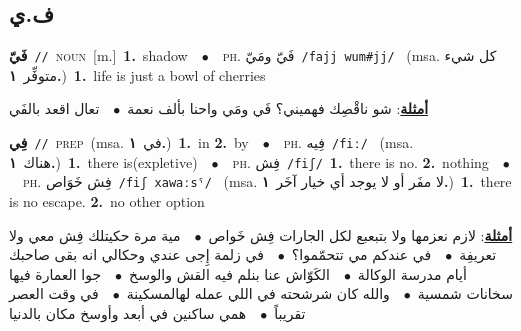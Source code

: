 \documentclass[10pt,a4paper,twoside]{article} %
\begin{document}
\begin{multicols}{2}
\vspace{-3mm}
\subsection*{\color{blue}\foreignlanguage{arabic}{ف.ي}\color{blue}{}} 

{\setlength\topsep{0pt}\textbf{\foreignlanguage{arabic}{فَيّ}}\ {\color{gray}\texttt{//}\color{black}}\ \textsc{noun}\ [m.]\ \textbf{1.}~shadow\ \ $\bullet$\ \ \textsc{ph.} \color{gray} \foreignlanguage{arabic}{فَيّ ومَيّ}\color{black}\ {\color{gray}\texttt{/{\sffamily fajj wum\#jj}/}\color{black}}\ \color{gray} (msa. \foreignlanguage{arabic}{كل شيء متوفِّر}~\foreignlanguage{arabic}{\textbf{١.}})\color{black}\ \textbf{1.}~life is just a bowl of cherries\  \begin{flushright}\color{gray}\foreignlanguage{arabic}{\textbf{\underline{\foreignlanguage{arabic}{أمثلة}}}: شو ناقْصِك فهميني؟ فَي ومَي واحنا بألف نعمة\ $\bullet$\ \  تعال اقعد بالفَي}\end{flushright}\color{black}} \vspace{2mm}

{\setlength\topsep{0pt}\textbf{\foreignlanguage{arabic}{فِي}}\ {\color{gray}\texttt{//}\color{black}}\ \textsc{prep}\ \color{gray}(msa. \foreignlanguage{arabic}{في}~\foreignlanguage{arabic}{\textbf{١.}})\color{black}\ \textbf{1.}~in  \textbf{2.}~by\ \ $\bullet$\ \ \textsc{ph.} \color{gray} \foreignlanguage{arabic}{فِيه}\color{black}\ {\color{gray}\texttt{/{\sffamily fiː}/}\color{black}}\ \color{gray} (msa. \foreignlanguage{arabic}{هناك}~\foreignlanguage{arabic}{\textbf{١.}})\color{black}\ \textbf{1.}~there is(expletive)\ \ $\bullet$\ \ \textsc{ph.} \color{gray} \foreignlanguage{arabic}{فِش}\color{black}\ {\color{gray}\texttt{/{\sffamily fiʃ}/}\color{black}}\ \textbf{1.}~there is no.  \textbf{2.}~nothing\ \ $\bullet$\ \ \textsc{ph.} \color{gray} \foreignlanguage{arabic}{فِش خَوَاص}\color{black}\ {\color{gray}\texttt{/{\sffamily fiʃ xawaːsˤ}/}\color{black}}\ \color{gray} (msa. \foreignlanguage{arabic}{لا مفَر أو لا يوجد أي خيار آخَر}~\foreignlanguage{arabic}{\textbf{١.}})\color{black}\ \textbf{1.}~there is no escape.  \textbf{2.}~no other option\  \begin{flushright}\color{gray}\foreignlanguage{arabic}{\textbf{\underline{\foreignlanguage{arabic}{أمثلة}}}: لازم نعزمها ولا بتبعبع لكل الجارات فِش خَواص\ $\bullet$\ \  مية مرة حكيتلك فِش معي ولا تعريفِة\ $\bullet$\ \   في عندكم مي تتحمّموا؟\ $\bullet$\ \  في زلمة إِجى عندي وحكالي انه بقى صاحبك أيام مدرسة الوكالة\ $\bullet$\ \  الكَوّاش عنا بنلم فيه القش والوسخ\ $\bullet$\ \  جوا العمارة فيها سخانات شمسية\ $\bullet$\ \  والله كان شرشحته في اللي عمله لهالمسكينة\ $\bullet$\ \  في وقت العصر تقريباً\ $\bullet$\ \  همي ساكنين في أبعد وأوسخ مكان بالدنيا}\end{flushright}\color{black}} \vspace{2mm}


\end{multicols}
\end{document}
